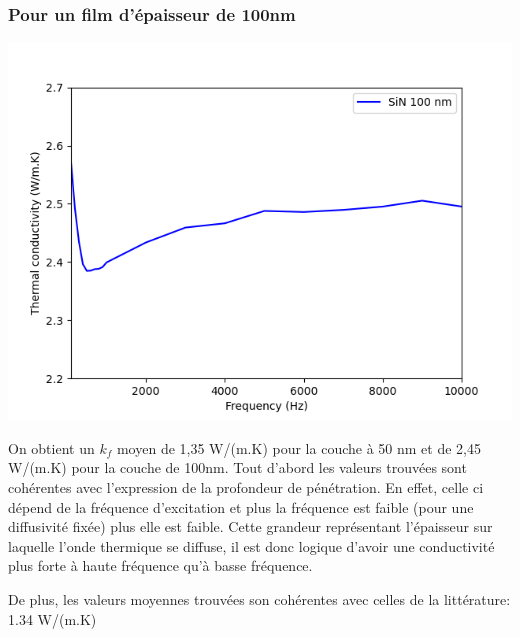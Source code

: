 \documentclass[10pt,a4paper]{report}
\begin{document}
\subsubsection{Pour un film d'épaisseur de 100nm}
\begin{center}
\includegraphics[scale=0.7]{kappa100nm.png}
\end{center}
On obtient un $k_{f}$ moyen de 1,35 W/(m.K) pour la couche à 50 nm et de 2,45 W/(m.K) pour la couche de 100nm.
\newline
\newline
Tout d'abord les valeurs trouvées sont cohérentes avec l'expression de la profondeur de pénétration. En effet, celle ci dépend de la fréquence d'excitation et plus la fréquence est faible (pour une diffusivité fixée) plus elle est faible. Cette grandeur représentant l'épaisseur sur laquelle l'onde thermique se diffuse, il est donc logique d'avoir une conductivité plus forte à haute fréquence qu'à basse fréquence.

De plus, les valeurs moyennes trouvées son cohérentes avec celles de la littérature: 1.34 W/(m.K)
\end{document}
